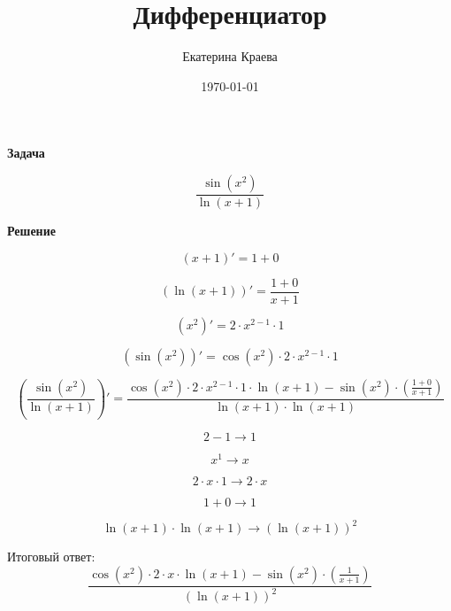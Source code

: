 \documentclass[12pt,a4paper]{extreport}
\title{\textbf{Дифференциатор}}
\author{Екатерина Краева}
\date{\today}
\newenvironment{task}[1]
{
\par\noindent
\textbf{Задача}
\par\medskip
}
{
\par\bigskip
}
\newenvironment{solution}
{
\par\noindent
\textbf{Решение}
\par\medskip}
{
\par\bigskip
}
\begin{document}
\begin{task}{1}
\[
\frac{\sin({x}^{2})}{\ln(x + 1)}\]
\end{task}

\begin{solution}
\[
(x + 1)' = 1 + 0
\]

\[
(\ln(x + 1))' = \frac{1 + 0}{x + 1}
\]

\[
({x}^{2})' = 2 \cdot {x}^{2 - 1} \cdot 1
\]

\[
(\sin({x}^{2}))' = \cos({x}^{2}) \cdot 2 \cdot {x}^{2 - 1} \cdot 1
\]

\[
(\frac{\sin({x}^{2})}{\ln(x + 1)})' = \frac{\cos({x}^{2}) \cdot 2 \cdot {x}^{2 - 1} \cdot 1 \cdot \ln(x + 1) - \sin({x}^{2}) \cdot (\frac{1 + 0}{x + 1})}{\ln(x + 1) \cdot \ln(x + 1)}
\]

\[
2 - 1 \longrightarrow 1
\]

\[
{x}^{1} \longrightarrow x
\]

\[
2 \cdot x \cdot 1 \longrightarrow 2 \cdot x
\]

\[
1 + 0 \longrightarrow 1
\]

\[
\ln(x + 1) \cdot \ln(x + 1) \longrightarrow {(\ln(x + 1))}^{2}
\]

Итоговый ответ: \\
\[
\boxed{
\frac{\cos({x}^{2}) \cdot 2 \cdot x \cdot \ln(x + 1) - \sin({x}^{2}) \cdot (\frac{1}{x + 1})}{{(\ln(x + 1))}^{2}}
}
\]
\end{solution}
\end{document}
